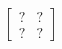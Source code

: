 \documentclass[preview]{standalone}
\begin{document}
\begin{align*}
\begin{bmatrix} ? & ? \\ ? & ? \end{bmatrix}
\end{align*}
\end{document}
